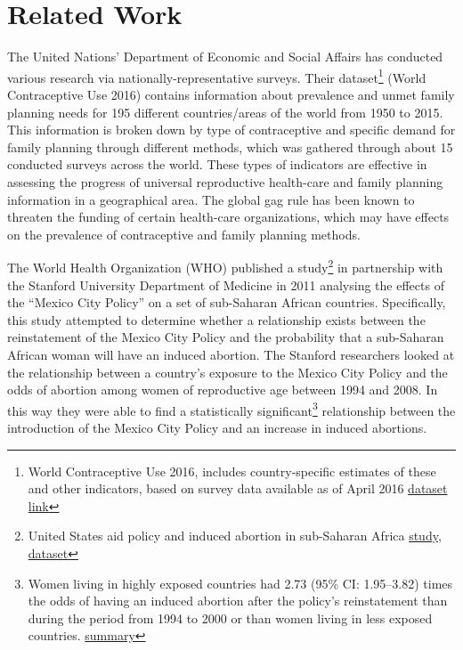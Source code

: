\documentclass[11pt,]{article}
\begin{document}
\section{Related Work}\label{related-work}

The United Nations' Department of Economic and Social Affairs has
conducted various research via nationally-representative surveys. Their
dataset\footnote{World Contraceptive Use 2016, includes country-specific
  estimates of these and other indicators, based on survey data
  available as of April 2016
  \href{http://www.un.org/en/development/desa/population/publications/dataset/contraception/wcu2016.shtml}{dataset
  link}} (World Contraceptive Use 2016) contains information about
prevalence and unmet family planning needs for 195 different
countries/areas of the world from 1950 to 2015. This information is
broken down by type of contraceptive and specific demand for family
planning through different methods, which was gathered through about 15
conducted surveys across the world. These types of indicators are
effective in assessing the progress of universal reproductive
health-care and family planning information in a geographical area. The
global gag rule has been known to threaten the funding of certain
health-care organizations, which may have effects on the prevalence of
contraceptive and family planning methods.

The World Health Organization (WHO) published a study\footnote{United
  States aid policy and induced abortion in sub-Saharan Africa
  \href{http://www.who.int/bulletin/volumes/89/12/11-091660/en/}{study},
  \href{http://www.who.int/bulletin/volumes/89/12/BLT-11-091660-table-T1.html}{dataset}}
in partnership with the Stanford University Department of Medicine in
2011 analysing the effects of the ``Mexico City Policy'' on a set of
sub-Saharan African countries. Specifically, this study attempted to
determine whether a relationship exists between the reinstatement of the
Mexico City Policy and the probability that a sub-Saharan African woman
will have an induced abortion. The Stanford researchers looked at the
relationship between a country's exposure to the Mexico City Policy and
the odds of abortion among women of reproductive age between 1994 and
2008. In this way they were able to find a statistically
significant\footnote{Women living in highly exposed countries had 2.73
  (95\% CI: 1.95--3.82) times the odds of having an induced abortion
  after the policy's reinstatement than during the period from 1994 to
  2000 or than women living in less exposed countries.
  \href{http://www.who.int/bulletin/volumes/89/12/BLT-11-091660-table-T3.html}{summary}}
relationship between the introduction of the Mexico City Policy and an
increase in induced abortions.
\end{document}
